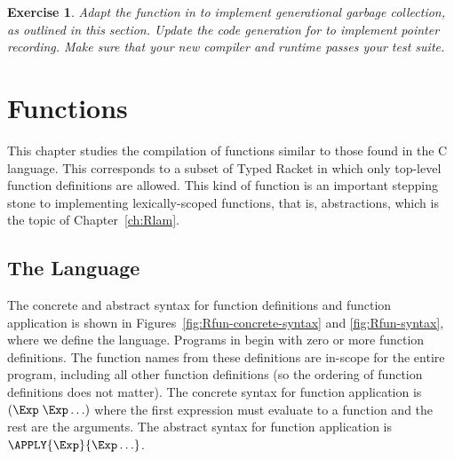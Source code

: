\documentclass[11pt]{book}
\newtheorem{exercise}[theorem]{Exercise}
\begin{document}
\begin{exercise}\normalfont
  Adapt the  function in  to implement
  generational garbage collection, as outlined in this section.
  Update the code generation for  to implement
  pointer recording. Make sure that your new compiler and runtime
  passes your test suite.
\end{exercise}


\chapter{Functions}
\label{ch:Rfun}

This chapter studies the compilation of functions similar to those
found in the C language. This corresponds to a subset of Typed Racket
in which only top-level function definitions are allowed. This kind of
function is an important stepping stone to implementing
lexically-scoped functions, that is,  abstractions, which
is the topic of Chapter~\ref{ch:Rlam}.

\section{The \LangFun{} Language}

The concrete and abstract syntax for function definitions and function
application is shown in Figures~\ref{fig:Rfun-concrete-syntax} and
\ref{fig:Rfun-syntax}, where we define the \LangFun{} language.  Programs in
\LangFun{} begin with zero or more function definitions.  The function
names from these definitions are in-scope for the entire program,
including all other function definitions (so the ordering of function
definitions does not matter). The concrete syntax for function
application is $(\Exp \; \Exp \ldots)$
where the first expression must
evaluate to a function and the rest are the arguments.
The abstract syntax for function application is
$\APPLY{\Exp}{\Exp\ldots}$. 

\end{document}
